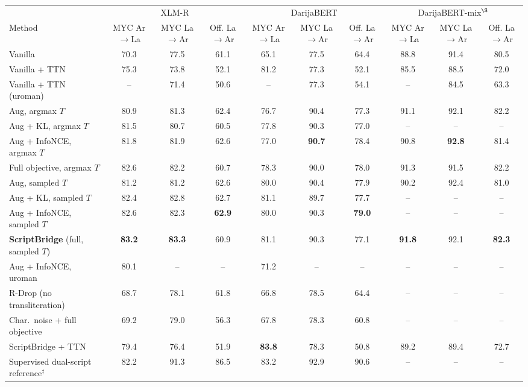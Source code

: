 \begin{lrbox}{\tblbox}\footnotesize\setlength{\tabcolsep}{3.2pt}%
\begin{tabular}{@{}lccccccccc@{}}
\toprule
 & \multicolumn{3}{c}{XLM-R} & \multicolumn{3}{c}{DarijaBERT} & \multicolumn{3}{c}{DarijaBERT-mix$^{\S}$}\\
\cmidrule(lr){2-4}\cmidrule(lr){5-7}\cmidrule(lr){8-10}
Method & \shortstack{MYC\\Ar$\to$La} & \shortstack{MYC\\La$\to$Ar} & \shortstack{Off.\\La$\to$Ar} & \shortstack{MYC\\Ar$\to$La} & \shortstack{MYC\\La$\to$Ar} & \shortstack{Off.\\La$\to$Ar} & \shortstack{MYC\\Ar$\to$La} & \shortstack{MYC\\La$\to$Ar} & \shortstack{Off.\\La$\to$Ar}\\
\midrule
Vanilla & 70.3 & 77.5 & 61.1 & 65.1 & 77.5 & 64.4 & 88.8 & 91.4 & 80.5\\
Vanilla + TTN & 75.3 & 73.8 & 52.1 & 81.2 & 77.3 & 52.1 & 85.5 & 88.5 & 72.0\\
Vanilla + TTN (uroman) & -- & 71.4 & 50.6 & -- & 77.3 & 54.1 & -- & 84.5 & 63.3\\
\midrule
Aug, argmax $T$ & 80.9 & 81.3 & 62.4 & 76.7 & 90.4 & 77.3 & 91.1 & 92.1 & 82.2\\
Aug + KL, argmax $T$ & 81.5 & 80.7 & 60.5 & 77.8 & 90.3 & 77.0 & -- & -- & --\\
Aug + InfoNCE, argmax $T$ & 81.8 & 81.9 & 62.6 & 77.0 & \textbf{90.7} & 78.4 & 90.8 & \textbf{92.8} & 81.4\\
Full objective, argmax $T$ & 82.6 & 82.2 & 60.7 & 78.3 & 90.0 & 78.0 & 91.3 & 91.5 & 82.2\\
\midrule
Aug, sampled $T$ & 81.2 & 81.2 & 62.6 & 80.0 & 90.4 & 77.9 & 90.2 & 92.4 & 81.0\\
Aug + KL, sampled $T$ & 82.4 & 82.8 & 62.7 & 81.1 & 89.7 & 77.7 & -- & -- & --\\
Aug + InfoNCE, sampled $T$ & 82.6 & 82.3 & \textbf{62.9} & 80.0 & 90.3 & \textbf{79.0} & -- & -- & --\\
\textbf{ScriptBridge} (full, sampled $T$) & \textbf{83.2} & \textbf{83.3} & 60.9 & 81.1 & 90.3 & 77.1 & \textbf{91.8} & 92.1 & \textbf{82.3}\\
\midrule
Aug + InfoNCE, uroman & 80.1 & -- & -- & 71.2 & -- & -- & -- & -- & --\\
R-Drop (no transliteration) & 68.7 & 78.1 & 61.8 & 66.8 & 78.5 & 64.4 & -- & -- & --\\
Char.\ noise + full objective & 69.2 & 79.0 & 56.3 & 67.8 & 78.3 & 60.8 & -- & -- & --\\
\midrule
ScriptBridge + TTN & 79.4 & 76.4 & 51.9 & \textbf{83.8} & 78.3 & 50.8 & 89.2 & 89.4 & 72.7\\
\midrule
Supervised dual-script reference$^{\ddagger}$ & 82.2 & 91.3 & 86.5 & 83.2 & 92.9 & 90.6 & -- & -- & --\\
\bottomrule
\end{tabular}%
\end{lrbox}
